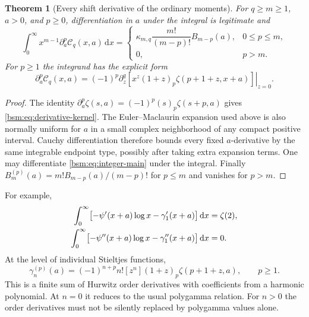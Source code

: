 \documentclass[11pt,letterpaper]{article}
\numberwithin{equation}{section}
\newtheorem{theorem}{Theorem}[section]
\theoremstyle{definition}\newtheorem{definition}[theorem]{Definition}
\theoremstyle{remark}\newtheorem{remark}[theorem]{Remark}
\newcommand{\dd}{\,\mathrm{d}}
\newcommand{\Ccal}{\mathcal C}
\begin{document}
\begin{theorem}[Every shift derivative of the ordinary moments]\label{bsm:thm:derivatives}
For $q\ge m\ge1$, $a>0$, and $p\ge0$, differentiation in $a$ under
the integral is legitimate and
\begin{equation}\label{bsm:eq:derivative-moments}
 \int_0^\infty x^{m-1}\partial_a^p\Ccal_q(x,a)\dd x
 =\begin{cases}
 \kappa_{m,q}\dfrac{m!}{(m-p)!}B_{m-p}(a),&0\le p\le m,\\[5pt]
 0,&p>m.
 \end{cases}
\end{equation}
For $p\ge1$ the integrand has the explicit form
\begin{equation}\label{bsm:eq:derivative-kernel}
 \partial_a^p\Ccal_q(x,a)
 =(-1)^p\left.\partial_z^q
      \left[x^z(1+z)_p\zeta(p+1+z,x+a)\right]\right|_{z=0}.
\end{equation}
\end{theorem}
\begin{proof}
The identity $\partial_a^p\zeta(s,a)=(-1)^p(s)_p\zeta(s+p,a)$
gives \eqref{bsm:eq:derivative-kernel}. The Euler--Maclaurin expansion
used above is also normally uniform for $a$ in a small complex
neighborhood of any compact positive interval. Cauchy differentiation
therefore bounds every fixed $a$-derivative by the same integrable
endpoint type, possibly after taking extra expansion terms. One may
differentiate \eqref{bsm:eq:integer-main} under the integral. Finally
$B_m^{(p)}(a)=m!B_{m-p}(a)/(m-p)!$ for $p\le m$ and vanishes for
$p>m$.
\end{proof}

For example,
\begin{align}\label{bsm:eq:derivative-examples}
 \int_0^\infty\bigl[-\psi'(x+a)\log x-\gamma_1'(x+a)\bigr]\dd x
       &=\zeta(2),\notag\\
 \int_0^\infty\bigl[-\psi''(x+a)\log x-\gamma_1''(x+a)\bigr]\dd x
       &=0.
\end{align}
At the level of individual Stieltjes functions,
\begin{equation}\label{bsm:eq:Stieltjes-argument}
 \gamma_n^{(p)}(a)=(-1)^{n+p}n![z^n]
                         (1+z)_p\zeta(p+1+z,a),\qquad p\ge1.
\end{equation}
This is a finite sum of Hurwitz order derivatives with coefficients
from a harmonic polynomial. At $n=0$ it reduces to the usual
polygamma relation. For $n>0$ the order derivatives must not be
silently replaced by polygamma values alone.
\end{document}
